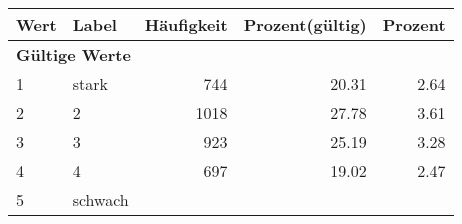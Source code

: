      \begin{longtable}{lXrrr}
     \toprule
     \textbf{Wert} & \textbf{Label} & \textbf{Häufigkeit} & \textbf{Prozent(gültig)} & \textbf{Prozent} \\
     \endhead
     \midrule
     \multicolumn{5}{l}{\textbf{Gültige Werte}}\\

     1 &
     \multicolumn{1}{X}{ stark   } &


       \num{744} &
       \num[round-mode=places,round-precision=2]{20,31} &
         \num[round-mode=places,round-precision=2]{2,64} \\

     2 &
     \multicolumn{1}{X}{ 2   } &


       \num{1018} &
       \num[round-mode=places,round-precision=2]{27,78} &
         \num[round-mode=places,round-precision=2]{3,61} \\

     3 &
     \multicolumn{1}{X}{ 3   } &


       \num{923} &
       \num[round-mode=places,round-precision=2]{25,19} &
         \num[round-mode=places,round-precision=2]{3,28} \\

     4 &
     \multicolumn{1}{X}{ 4   } &


       \num{697} &
       \num[round-mode=places,round-precision=2]{19,02} &
         \num[round-mode=places,round-precision=2]{2,47} \\

     5 &
     \multicolumn{1}{X}{ schwach   } &



\end{longtable}
